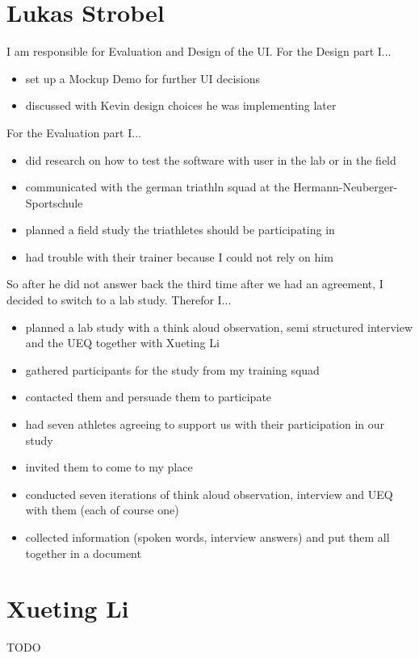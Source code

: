\documentclass{sigchi}
\begin{document}
\section{Lukas Strobel}
I am responsible for Evaluation and Design of the UI.
For the Design part I...
\begin{itemize}
\item set up a Mockup Demo for further UI decisions
\item discussed with Kevin design choices he was implementing later
\end{itemize}
For the Evaluation part I...
\begin{itemize}
\item did research on how to test the software with user in the lab or in the field
\item communicated with the german triathln squad at the Hermann-Neuberger-Sportschule
\item planned a field study the triathletes should be participating in
\item had trouble with their trainer because I could not rely on him
\end{itemize}
So after he did not answer back the third time after we had an agreement, I decided to switch to a lab study. Therefor I...
\begin{itemize}
\item planned a lab study with a think aloud observation, semi structured interview and the UEQ together with Xueting Li
\item gathered participants for the study from my training squad
\item contacted them and persuade them to participate
\item had seven athletes agreeing to support us with their participation in our study
\item invited them to come to my place
\item conducted seven iterations of think aloud observation, interview and UEQ with them (each of course one)
\item collected information (spoken words, interview answers) and put them all together in a document
\end{itemize}

\section{Xueting Li}
TODO

\balance{}
\end{document}
